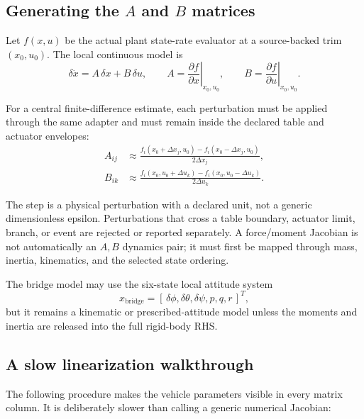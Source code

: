 \documentclass[11pt]{article}
\begin{document}
\subsection{\texorpdfstring{Generating the $A$ and $B$ matrices}{Generating the A and B matrices}}

Let $f(x,u)$ be the actual plant state-rate evaluator at a source-backed trim
$(x_0,u_0)$. The local continuous model is
\[
  \delta\dot{x} = A\,\delta x + B\,\delta u,
  \qquad
  A = \left.\frac{\partial f}{\partial x}\right|_{x_0,u_0},
  \qquad
  B = \left.\frac{\partial f}{\partial u}\right|_{x_0,u_0}.
\]

For a central finite-difference estimate, each perturbation must be applied
through the same adapter and must remain inside the declared table and actuator
envelopes:
\begin{align}
  A_{ij} &\approx
  \frac{f_i(x_0+\Delta x_j,u_0)-f_i(x_0-\Delta x_j,u_0)}{2\Delta x_j},\\
  B_{ik} &\approx
  \frac{f_i(x_0,u_0+\Delta u_k)-f_i(x_0,u_0-\Delta u_k)}{2\Delta u_k}.
\end{align}

The step is a physical perturbation with a declared unit, not a generic
dimensionless epsilon. Perturbations that cross a table boundary, actuator
limit, branch, or event are rejected or reported separately. A force/moment
Jacobian is not automatically an $A,B$ dynamics pair; it must first be mapped
through mass, inertia, kinematics, and the selected state ordering.

The bridge model may use the six-state local attitude system
\[
  x_{\mathrm{bridge}} =
  [\,\delta\phi,\delta\theta,\delta\psi,p,q,r\,]^{T},
\]
but it remains a kinematic or prescribed-attitude model unless the moments and
inertia are released into the full rigid-body RHS.

\subsection{A slow linearization walkthrough}

The following procedure makes the vehicle parameters visible in every matrix
column. It is deliberately slower than calling a generic numerical Jacobian:
\end{document}
